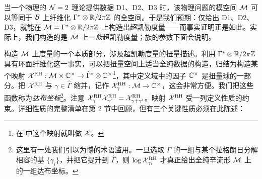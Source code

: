 当一个物理的 $\mathcal{N}=2$ 理论提供数据 D1、D2、D3 时，该物理问题的模空间 $\mathcal{M}$ 可以等同于 $\mathcal{B}$ 上纤维化 $\Gamma^* \otimes \mathbb{R}/2\pi \mathbb{Z}$ 的全空间。于是我们预期：仅给出 D1、D2、D3，就能在 $\mathcal{M}=\Gamma^* \otimes \mathbb{R}/2\pi \mathbb{Z}$ 上构造出超凯勒度量——而事实证明正是如此。实际上，我们构造的是 $\mathcal{M}$ 上一\emph{族}超凯勒度量；族的参数下面会说明。

构造 $\mathcal{M}$ 上度量的一个本质部分，涉及超凯勒度量的扭量描述。利用 $\hat \Gamma^* \otimes \mathbb{R}/2\pi \mathbb{Z}$ 具有环面纤维化这一事实，可以把扭量空间上适当全纯数据的构造，归结为构造某个映射 $\mathcal{X}^{\rm RH}: \mathcal{M} \times \mathbb{C}^\times \to \hat \Gamma^* \otimes \mathbb{C}^\times$\footnote{在 \cite{Gaiotto:2008cd} 中这个映射就叫做 $\mathcal{X}$。}，其中定义域中的因子 $\mathbb{C}^\times$ 是扭量球的一部分。把 $\mathcal{X}^{\rm RH}$ 与 $\gamma\in \hat \Gamma$ 缩并，记作 $\mathcal{X}^{\rm RH}_{\gamma}: \mathcal{M} \to \mathbb{C}^\times$，这会非常方便。我们把这些函数称为\emph{达布坐标}\footnote{这里有一处我们引以为憾的术语滥用。一旦选取 $\Gamma$ 的一组与某个拉格朗日分解相容的基 $\{\gamma_i\}$，并把它提升到 $\hat \Gamma$，则 $\log \mathcal{X}_{\gamma_i}^{\rm RH}$ 才真正给出全纯辛流形 $\mathcal{M}$ 上的一组达布坐标。}。注意 $\mathcal{X}^{\rm RH}_{\gamma}\mathcal{X}^{\rm RH}_{\gamma'} = \mathcal{X}^{\rm RH}_{\gamma+\gamma'}$。映射 $\mathcal{X}^{\rm RH}$ 受一列定义性质的约束。详细性质的完整清单在第 2 节中回顾，但有三个关键性质必须在此陈述：

